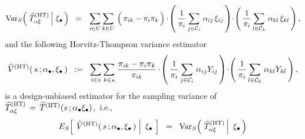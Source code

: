\begin{itemize}
    \begin{equation*}
    \Var_{S}\!\left(\,
        \left.
        \widehat{T}^{\textnormal{(HT)}}_{\alpha\xi}
        \,\right\vert\!\!
        \begin{array}{c} \xi_{\bullet} \end{array}
        \!\!\right)
    \;\; = \;\;\,
        \underset{i \in U}{\sum}\,
        \underset{k \in U}{\sum}\,
        \left(\,\pi_{ik} \overset{{\color{white}.}}{-} \pi_{i}\pi_{k}\,\right)
        \cdot\!
        \left(\,
            \dfrac{1}{\pi_{i}}\,
            \underset{j\in\mathcal{C}_{i}}{\sum}\;\alpha_{ij}\,\xi_{ij}
            \,\right)
        \!\cdot\!
        \left(\,
            \dfrac{1}{\pi_{i}}\,
            \underset{l\in\mathcal{C}_{k}}{\sum}\;\alpha_{kl}\,\xi_{kl}
            \,\right),
    \end{equation*}
    and the following Horvitz-Thompson variance estimator
    \begin{equation*}
    \widehat{V}^{\textnormal{(HT)}}(\,s\,;\alpha_{\bullet},\xi_{\bullet}\,)
    \;\; := \;\;
        \underset{i \in s}{\sum}\,
        \underset{k \in s}{\sum}\;
        \dfrac{\pi_{ik} - \pi_{i}\pi_{k}}{\pi_{ik}}
        \cdot\!
        \left(\,
            \dfrac{1}{\pi_{i}}\,
            \underset{j\in\mathcal{C}_{i}}{\sum}\;\alpha_{ij}Y_{ij}
            \,\right)
        \!\cdot\!
        \left(\,
            \dfrac{1}{\pi_{i}}\,
            \underset{l\in\mathcal{C}_{k}}{\sum}\;\alpha_{kl}Y_{kl}
            \,\right),
    \end{equation*}
    is a design-unbiased estimator for the sampling variance of
    \,$
    \widehat{T}^{\textnormal{(HT)}}_{\alpha\xi}
    \,=\,
        \widehat{T}^{\textnormal{(HT)}}(s\,;\alpha_{\bullet}\xi_{\bullet})
    $,\,
    i.e.,
    \begin{equation*}
    E_{S}\!\left[\;
        \left.
        \widehat{V}^{\textnormal{(HT)}}(\,s\,;\abullet,\xi_{\bullet}\,)
        \;\right\vert\!
        \begin{array}{c} \xi_{\bullet} \end{array}
        \!\right]
    \;\; = \;\;
        \Var_{S}\!\left(\,
            \left.
            \widehat{T}^{\textnormal{(HT)}}_{\alpha\xi} %
            \,\right\vert\!
            \begin{array}{c} \xi_{\bullet} \end{array}
            \!\!\right)
    \end{equation*}

\end{itemize}
